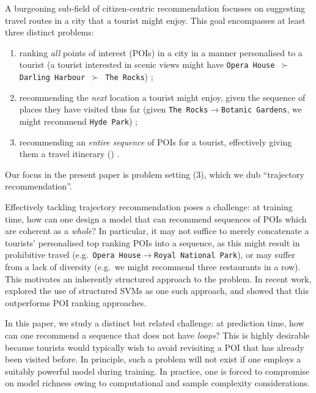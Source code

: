 
A burgeoning sub-field of citizen-centric recommendation focusses on suggesting travel routes in a city that a tourist might enjoy.
This goal encompasses at least three distinct problems:
\begin{enumerate}[(1)]
	\item ranking \emph{all} points of interest (POIs) in a city in a manner personalised to a tourist (\eg a tourist interested in scenic views might have {\tt Opera House $\succ$ Darling Harbour $\succ$ The Rocks}) \citep{shi2011personalized,lian2014geomf,hsieh2014mining,yuan2014graph};
	\item recommending the \emph{next} location a tourist might enjoy, given the sequence of places they have visited thus far (\eg given {\tt The Rocks$\to$Botanic Gardens}, we might recommend {\tt Hyde Park}) \citep{fpmc10,ijcai13,zhang2015location};
	\item recommending an \emph{entire sequence} of POIs for a tourist, effectively giving them a travel itinerary () \citep{lu2010photo2trip,ijcai15,lu2012personalized,gioniswsdm14,chen2015tripplanner}.
\end{enumerate}
Our focus in the present paper is problem setting (3), which we dub ``trajectory recommendation''.

Effectively tackling trajectory recommendation poses a challenge:
at training time, how can one design a model that can recommend sequences of POIs which are coherent as a \emph{whole}?
In particular, it may not suffice to merely concatenate a tourists' personalised top ranking POIs into a sequence,
as this might result in prohibitive travel (e.g.\ {\tt Opera House$\to$Royal National Park}),
or may suffer from a lack of diversity (e.g.\ we might recommend three restaurants in a row).
This motivates an inherently structured approach to the problem.
In recent work, \citet{Chen:2017} explored the use of structured SVMs as one such approach, and showed that this outperforms POI ranking approaches. %

In this paper, we study a distinct but related challenge:
at prediction time, how can one recommend a sequence that does not have \emph{loops}?
This is highly desirable because tourists would typically wish to avoid revisiting a POI that has already been visited before.
In principle, such a problem will not exist if one employs a suitably powerful model during training.
In practice, one is forced to compromise on model richness owing to computational and sample complexity considerations.

